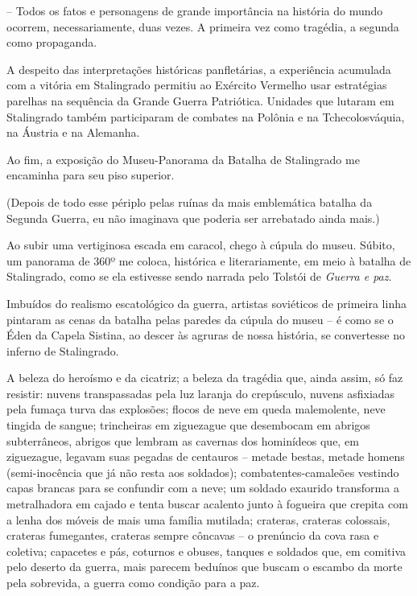 -- Todos os fatos e personagens de grande importância na história do
mundo ocorrem, necessariamente, duas vezes. A primeira vez como
tragédia, a segunda como propaganda.

A despeito das interpretações históricas panfletárias, a experiência
acumulada com a vitória em Stalingrado permitiu ao Exército Vermelho
usar estratégias parelhas na sequência da Grande Guerra Patriótica.
Unidades que lutaram em Stalingrado também participaram de combates na
Polônia e na Tchecolosváquia, na Áustria e na Alemanha.

Ao fim, a exposição do Museu-Panorama da Batalha de Stalingrado me
encaminha para seu piso superior.

(Depois de todo esse périplo pelas ruínas da mais emblemática batalha da
Segunda Guerra, eu não imaginava que poderia ser arrebatado ainda mais.)

Ao subir uma vertiginosa escada em caracol, chego à cúpula do museu.
Súbito, um panorama de 360º me coloca, histórica e literariamente, em
meio à batalha de Stalingrado, como se ela estivesse sendo narrada pelo
Tolstói de \emph{Guerra e paz}.

Imbuídos do realismo escatológico da guerra, artistas soviéticos de
primeira linha pintaram as cenas da batalha pelas paredes da cúpula do
museu -- é como se o Éden da Capela Sistina, ao descer às agruras de
nossa história, se convertesse no inferno de Stalingrado.

A beleza do heroísmo e da cicatriz; a beleza da tragédia que, ainda
assim, só faz resistir: nuvens transpassadas pela luz laranja do
crepúsculo, nuvens asfixiadas pela fumaça turva das explosões; flocos de
neve em queda malemolente, neve tingida de sangue; trincheiras em
ziguezague que desembocam em abrigos subterrâneos, abrigos que lembram
as cavernas dos hominídeos que, em ziguezague, legavam suas pegadas de
centauros -- metade bestas, metade homens (semi-inocência que já não
resta aos soldados); combatentes-camaleões vestindo capas brancas para
se confundir com a neve; um soldado exaurido transforma a metralhadora
em cajado e tenta buscar acalento junto à fogueira que crepita com a
lenha dos móveis de mais uma família mutilada; crateras, crateras
colossais, crateras fumegantes, crateras sempre côncavas -- o prenúncio
da cova rasa e coletiva; capacetes e pás, coturnos e obuses, tanques e
soldados que, em comitiva pelo deserto da guerra, mais parecem beduínos
que buscam o escambo da morte pela sobrevida, a guerra como condição
para a paz.

